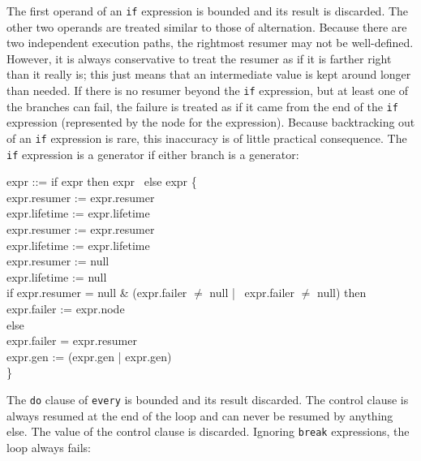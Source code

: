 The first operand of an \texttt{if} expression is bounded and its
result is discarded. The other two operands are treated similar to
those of alternation. Because there are two independent execution
paths, the rightmost resumer may not be well-defined. However, it is
always conservative to treat the resumer as if it is farther right
than it really is; this just means that an intermediate value is kept
around longer than needed. If there is no resumer beyond the
\texttt{if} expression, but at least one of the branches can fail, the
failure is treated as if it came from the end of the \texttt{if}
expression (represented by the node for the expression). Because
backtracking out of an \texttt{if} expression is rare, this inaccuracy
is of little practical consequence. The \texttt{if} expression is a
generator if either branch is a generator:

\goodbreak
\begin{iconcode}
\>expr ::= if expr then expr~%
                                    else expr \{\\
\>\>\>\>\>expr.resumer := expr.resumer\\
\>\>\>\>\>expr.lifetime := expr.lifetime\\
\>\>\>\>\>expr.resumer := expr.resumer\\
\>\>\>\>\>expr.lifetime := expr.lifetime\\
\>\>\>\>\>expr.resumer := null\\
\>\>\>\>\>expr.lifetime := null\\
\>\>\>\>\>if expr.resumer = null \& (expr.failer $\neq$ null |~%
                                  expr.failer $\neq$ null) then\\
\>\>\>\>\>\>expr.failer := expr.node\\
\>\>\>\>\>else\\
\>\>\>\>\>\>expr.failer = expr.resumer\\
\>\>\>\>\>expr.gen := (expr.gen | expr.gen)\\
\>\>\>\>\>\}\\
\end{iconcode}


The \texttt{do} clause of \texttt{every} is bounded and its result
discarded. The control clause is always resumed at the end of the loop
and can never be resumed by anything else. The value of the control
clause is discarded. Ignoring \texttt{break} expressions, the loop
always fails:


